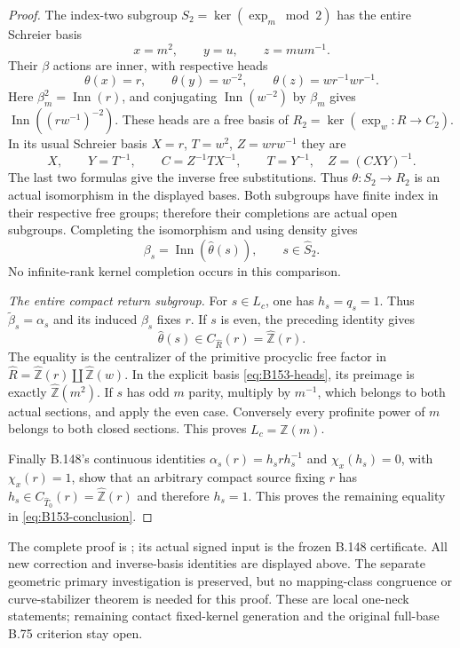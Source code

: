 \begin{proof}
The index-two subgroup
$S_2=\ker(\operatorname{exp}_m\bmod2)$ has the entire Schreier basis
\[
 x=m^2,\qquad y=u,\qquad z=mum^{-1}.
\]
Their $\beta$ actions are inner, with respective heads
\begin{equation}\label{eq:B153-heads}
 \theta(x)=r,\qquad\theta(y)=w^{-2},\qquad
 \theta(z)=wr^{-1}wr^{-1}.
\end{equation}
Here $\beta_m^2=\operatorname{Inn}(r)$, and conjugating
$\operatorname{Inn}(w^{-2})$ by $\beta_m$ gives
$\operatorname{Inn}((rw^{-1})^{-2})$.
These heads are a free basis of
$R_2=\ker(\operatorname{exp}_w:R\to C_2)$.
In its usual Schreier basis $X=r$, $T=w^2$, $Z=wrw^{-1}$ they are
\[
 X,\qquad Y=T^{-1},\qquad C=Z^{-1}TX^{-1},
 \qquad T=Y^{-1},\quad Z=(CXY)^{-1}.
\]
The last two formulas give the inverse free substitutions. Thus
$\theta:S_2\to R_2$ is an actual isomorphism in the displayed bases.
Both subgroups have finite index in their respective free groups;
therefore their completions are actual open subgroups. Completing the
isomorphism and using density gives
\[
 \beta_s=\operatorname{Inn}(\widehat\theta(s)),
 \qquad s\in\widehat S_2.
\]
No infinite-rank kernel completion occurs in this comparison.

\emph{The entire compact return subgroup.}
For $s\in L_c$, one has $h_s=q_s=1$. Thus
$\widetilde\beta_s=\alpha_s$ and its induced $\beta_s$ fixes $r$.
If $s$ is even, the preceding identity gives
\[
 \widehat\theta(s)\in C_{\widehat R}(r)
       =\widehat{\mathbb Z}(r).
\]
The equality is the centralizer of the primitive procyclic free factor
in $\widehat R=\widehat{\mathbb Z}(r)\amalg\widehat{\mathbb Z}(w)$.
In the explicit basis \eqref{eq:B153-heads}, its preimage is exactly
$\widehat{\mathbb Z}(m^2)$. If $s$ has odd $m$ parity, multiply by
$m^{-1}$, which belongs to both actual sections, and apply the even
case. Conversely every profinite power of $m$ belongs to both closed
sections. This proves $L_c=\widehat{\mathbb Z}(m)$.

Finally B.148's continuous identities
$\alpha_s(r)=h_srh_s^{-1}$ and $\chi_x(h_s)=0$, with $\chi_x(r)=1$,
show that an arbitrary compact source fixing $r$ has
$h_s\in C_{\widehat T_0}(r)=\widehat{\mathbb Z}(r)$ and therefore
$h_s=1$. This proves the remaining equality in
\eqref{eq:B153-conclusion}.
\end{proof}
The complete proof is
;
its actual signed input is the frozen B.148 certificate. All new
correction and inverse-basis identities are displayed above. The
separate geometric primary investigation is preserved, but no
mapping-class congruence or curve-stabilizer theorem is needed for this
proof. These are local one-neck statements; remaining contact
fixed-kernel generation and the original full-base B.75 criterion stay
open.
